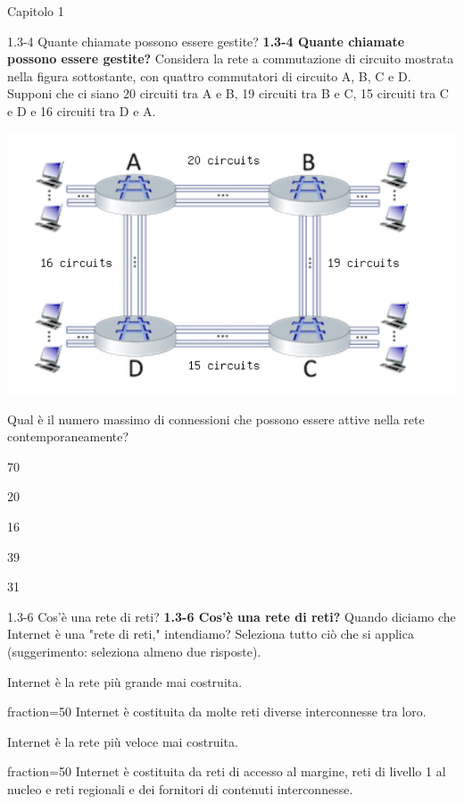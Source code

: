 \documentclass[a4paper]{article}
\begin{document}
\begin{quiz}{Capitolo 1}
\begin{multi}[points=1]{1.3-4 Quante chiamate possono essere gestite?}
\textbf{1.3-4 Quante chiamate possono essere gestite?} 
Considera la rete a commutazione di circuito mostrata nella figura sottostante, con quattro commutatori di circuito A, B, C e D. Supponi che ci siano 20 circuiti tra A e B, 19 circuiti tra B e C, 15 circuiti tra C e D e 16 circuiti tra D e A. 
\begin{center}
\includegraphics[width=\linewidth]{figs/1.3.4.png}
\end{center}
Qual è il numero massimo di connessioni che possono essere attive nella rete contemporaneamente?
\item* 70
\item 20
\item 16
\item 39
\item 31
\end{multi}

\begin{multi}[points=1,multiple]{1.3-6 Cos'è una rete di reti?}
\textbf{1.3-6 Cos'è una rete di reti?}  
Quando diciamo che Internet è una "rete di reti," intendiamo? Seleziona tutto ciò che si applica (suggerimento: seleziona almeno due risposte).
\item Internet è la rete più grande mai costruita.
\item[fraction=50] Internet è costituita da molte reti diverse interconnesse tra loro.
\item Internet è la rete più veloce mai costruita.
\item[fraction=50] Internet è costituita da reti di accesso al margine, reti di livello 1 al nucleo e reti regionali e dei fornitori di contenuti interconnesse.
\end{multi}


\end{quiz}
\end{document}
